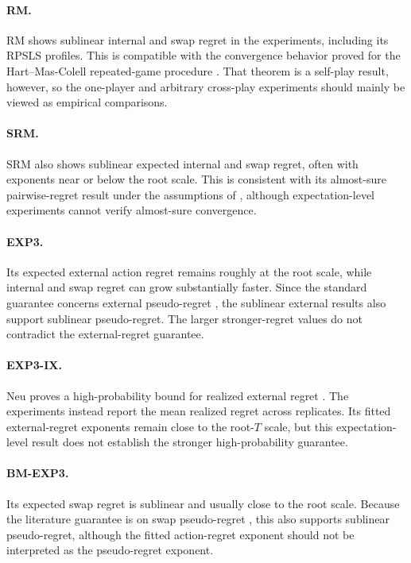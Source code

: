 \paragraph{RM.}
RM shows sublinear internal and swap regret in the experiments, including its
RPSLS profiles. This is compatible with the convergence behavior proved for
the Hart--Mas-Colell repeated-game procedure
\citep{hart_simple_2000}. That theorem is a self-play result, however, so the
one-player and arbitrary cross-play experiments should mainly be viewed as
empirical comparisons.

\paragraph{SRM.}
SRM also shows sublinear expected internal and swap regret, often with exponents
near or below the root scale. This is consistent with its almost-sure
pairwise-regret result under the assumptions of
\citet{hart_simple_2000}, although expectation-level experiments cannot verify
almost-sure convergence.

\paragraph{EXP3.}
Its expected external action regret remains roughly at the root scale, while
internal and swap regret can grow substantially faster. Since the standard
guarantee concerns external pseudo-regret
\citep{auer_nonstochastic_2002}, the sublinear external results also support
sublinear pseudo-regret. The larger stronger-regret values do not contradict
the external-regret guarantee.

\paragraph{EXP3-IX.}
Neu proves a high-probability bound for realized external regret
\citep{neu_explore_2015}. The experiments instead report the mean realized
regret across replicates. Its fitted external-regret exponents remain close to
the root-$T$ scale, but this expectation-level result does not establish the
stronger high-probability guarantee.

\paragraph{BM-EXP3.}
Its expected swap regret is sublinear and usually close to the root scale.
Because the literature guarantee is on swap pseudo-regret
\citep{blum_external_2007}, this also supports sublinear pseudo-regret, although
the fitted action-regret exponent should not be interpreted as the
pseudo-regret exponent.

